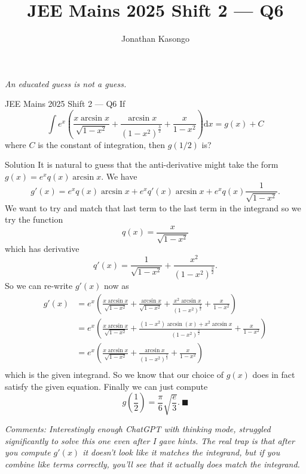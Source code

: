 \documentclass{article}
\author{Jonathan Kasongo}
\title{JEE Mains 2025 Shift 2 --- Q6}
\begin{document}
\maketitle
\textit{An educated guess is not a guess.}
\begin{problem}{JEE Mains 2025 Shift 2 --- Q6}
If
$$
\int e^x \left( \frac{x\arcsin x}{\sqrt{1-x^2}} +
                \frac{\arcsin x}{(1-x^2)^{\frac32}} +
                \frac{x}{1-x^2}
\right) \mathrm{d}x = g(x) + C
$$
where $C$ is the constant of integration, then $g(1/2)$ is?
\end{problem}

\begin{solution}{Solution}
It is natural to guess that the anti-derivative might take the form
$g(x) = e^x q(x) \arcsin x$. We have
$$
g'(x) = e^x q(x) \arcsin x + e^x q'(x)\arcsin x +
e^x q(x)\frac{1}{\sqrt{1-x^2}}.
$$
We want to try and match that last term to the last term in the integrand
so we try the function
$$
q(x) = \frac{x}{\sqrt{1-x^2}}
$$
which has derivative
$$
q'(x) = \frac{1}{\sqrt{1-x^2}} + \frac{x^2}{(1-x^2)^{\frac32}}.
$$
So we can re-write $g'(x)$ now as
\[
\begin{aligned}
g'(x) &= e^x \left( \frac{x \arcsin x}{\sqrt{1-x^2}} +
                    \frac{\arcsin x}{\sqrt{1-x^2}}   +
                    \frac{x^2 \arcsin x}{(1-x^2)^\frac32} +
                    \frac{x}{1-x^2}
                    \right)\\
&= e^x \left( \frac{x \arcsin x}{\sqrt{1-x^2}} +
              \frac{(1-x^2)\arcsin (x) + x^2\arcsin x}{(1-x^2)^{\frac32}} +
              \frac{x}{1-x^2}
\right) \\
&= e^x \left( \frac{x\arcsin x}{\sqrt{1-x^2}} +
              \frac{\arcsin x}{(1-x^2)^{\frac32}} +
              \frac{x}{1-x^2}
\right)\\
\end{aligned}
\]
which is the given integrand. So we know that our choice of $g(x)$ does
in fact satisfy the given equation. Finally we can just compute
$$
g\left(\frac12\right) = \frac{\pi}{6}\sqrt{\frac{e}{3}}. \ \blacksquare
$$

\textit{Comments: Interestingly enough ChatGPT with thinking mode,
struggled significantly to solve this one even after I gave hints. The
real trap is that after you compute $g'(x)$ it doesn't look like it
matches the integrand, but if you combine like terms correctly, you'll
see that it actually does match the integrand.}
\end{solution}
\end{document}
